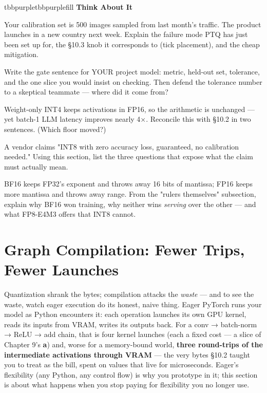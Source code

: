 \begin{calloutbox}{tbbpurple}{tbbpurplefill}
{\normalsize\bfseries\color{tbbpurple}Think About It}\par\vspace{3pt}
\begin{tbbitemize}
  \item Your calibration set is 500 images sampled from last month's traffic. The product launches in a new country next week. Explain the failure mode PTQ has just been set up for, the §10.3 knob it corresponds to (tick placement), and the cheap mitigation.
  \item Write the gate sentence for YOUR project model: metric, held-out set, tolerance, and the one slice you would insist on checking. Then defend the tolerance number to a skeptical teammate — where did it come from?
  \item Weight-only INT4 keeps activations in FP16, so the arithmetic is unchanged — yet batch-1 LLM latency improves nearly 4×. Reconcile this with §10.2 in two sentences. (Which floor moved?)
  \item A vendor claims "INT8 with zero accuracy loss, guaranteed, no calibration needed." Using this section, list the three questions that expose what the claim must actually mean.
  \item BF16 keeps FP32's exponent and throws away 16 bits of mantissa; FP16 keeps more mantissa and throws away range. From the "rulers themselves" subsection, explain why BF16 won training, why neither wins \textit{serving} over the other — and what FP8-E4M3 offers that INT8 cannot.
\end{tbbitemize}
\end{calloutbox}

\section{Graph Compilation: Fewer Trips, Fewer Launches}

Quantization shrank the bytes; compilation attacks the \textit{waste} — and to see the waste, watch eager execution do its honest, naive thing. Eager PyTorch runs your model as Python encounters it: each operation launches its own GPU kernel, reads its inputs from VRAM, writes its outputs back. For a conv → batch-norm → ReLU → add chain, that is four kernel launches (each a fixed cost — a slice of Chapter 9's \textbf{a}) and, worse for a memory-bound world, \textbf{three round-trips of the intermediate activations through VRAM} — the very bytes §10.2 taught you to treat as the bill, spent on values that live for microseconds. Eager's flexibility (any Python, any control flow) is why you prototype in it; this section is about what happens when you stop paying for flexibility you no longer use.

